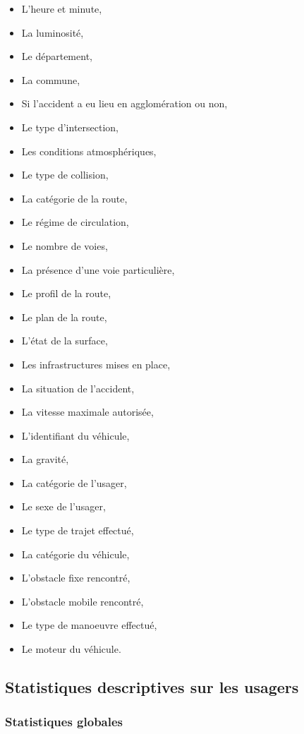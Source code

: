 \documentclass[french,]{tp}
\providecommand{\tightlist}{%
  \setlength{\itemsep}{0pt}\setlength{\parskip}{0pt}}
\begin{document}
\begin{itemize}
\tightlist
\item
  L'heure et minute,
\item
  La luminosité,
\item
  Le département,
\item
  La commune,
\item
  Si l'accident a eu lieu en agglomération ou non,
\item
  Le type d'intersection,
\item
  Les conditions atmosphériques,
\item
  Le type de collision,
\item
  La catégorie de la route,
\item
  Le régime de circulation,
\item
  Le nombre de voies,
\item
  La présence d'une voie particulière,
\item
  Le profil de la route,
\item
  Le plan de la route,
\item
  L'état de la surface,
\item
  Les infrastructures mises en place,
\item
  La situation de l'accident,
\item
  La vitesse maximale autorisée,
\item
  L'identifiant du véhicule,
\item
  La gravité,
\item
  La catégorie de l'usager,
\item
  Le sexe de l'usager,
\item
  Le type de trajet effectué,
\item
  La catégorie du véhicule,
\item
  L'obstacle fixe rencontré,
\item
  L'obstacle mobile rencontré,
\item
  Le type de manoeuvre effectué,
\item
  Le moteur du véhicule.
\end{itemize}

\hypertarget{statistiques-descriptives-sur-les-usagers}{%
\subsection{Statistiques descriptives sur les usagers}\label{statistiques-descriptives-sur-les-usagers}}

\hypertarget{statistiques-globales}{%
\subsubsection{Statistiques globales}\label{statistiques-globales}}
\end{document}
